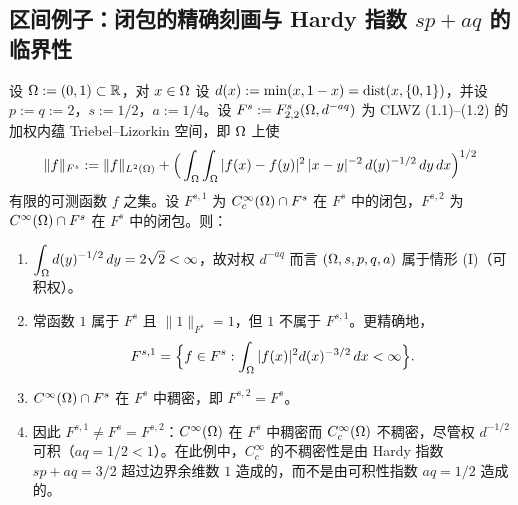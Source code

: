 \subsection{区间例子：闭包的精确刻画与 Hardy 指数 \texorpdfstring{$sp+aq$}{sp+aq} 的临界性}

\begin{theorem}
设 $\Omega:=(0,1)\subset\mathbb{R}$，对 $x\in\Omega$ 设 $d(x):=\min(x,1-x)=\operatorname{dist}(x,\{0,1\})$，并设 $p:=q:=2$，$s:=1/2$，$a:=1/4$。设 $F^s:=F^s_{2,2}(\Omega,d^{-aq})$ 为 CLWZ (1.1)--(1.2) 的加权内蕴 Triebel--Lizorkin 空间，即 $\Omega$ 上使
\[
  \|f\|_{F^s}:=\|f\|_{L^2(\Omega)}
  +\Big(\int_\Omega\int_\Omega|f(x)-f(y)|^2\,|x-y|^{-2}\,d(y)^{-1/2}\,dy\,dx\Big)^{1/2}
\]
有限的可测函数 $f$ 之集。设 $F^{s,1}$ 为 $C_c^\infty(\Omega)\cap F^s$ 在 $F^s$ 中的闭包，$F^{s,2}$ 为 $C^\infty(\Omega)\cap F^s$ 在 $F^s$ 中的闭包。则：
\begin{enumerate}[label=(\roman*)]
  \item $\displaystyle\int_\Omega d(y)^{-1/2}\,dy=2\sqrt2<\infty$，故对权 $d^{-aq}$ 而言 $(\Omega,s,p,q,a)$ 属于情形 (I)（可积权）。
  \item 常函数 $1$ 属于 $F^s$ 且 $\|1\|_{F^s}=1$，但 $1$ 不属于 $F^{s,1}$。更精确地，
  \[
    F^{s,1}=\Big\{f\in F^s:\int_\Omega|f(x)|^2d(x)^{-3/2}\,dx<\infty\Big\}.
  \]
  \item $C^\infty(\Omega)\cap F^s$ 在 $F^s$ 中稠密，即 $F^{s,2}=F^s$。
  \item 因此 $F^{s,1}\neq F^s=F^{s,2}$：$C^\infty(\Omega)$ 在 $F^s$ 中稠密而 $C_c^\infty(\Omega)$ 不稠密，尽管权 $d^{-1/2}$ 可积（$aq=1/2<1$）。在此例中，$C_c^\infty$ 的不稠密性是由 Hardy 指数 $sp+aq=3/2$ 超过边界余维数 $1$ 造成的，而不是由可积性指数 $aq=1/2$ 造成的。
\end{enumerate}
\end{theorem}

